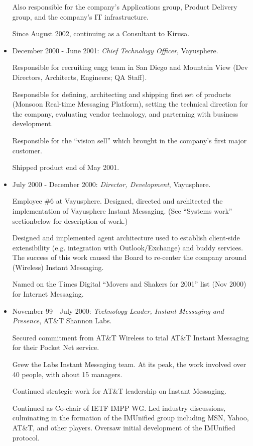 \documentclass{article}
\begin{document}
\begin{itemize}
  Also responsible for the company's Applications group, Product
  Delivery group, and the company's IT infrastructure. 

  Since August 2002, continuing as a Consultant to Kirusa.

\item December 2000 - June 2001: \textit{Chief Technology Officer}, Vayusphere.

  Responsible for recruiting engg team in San Diego and Mountain View
  (Dev Directors, Architects, Engineers; QA Staff).

  Responsible for defining, architecting and shipping first set of
  products (Monsoon Real-time Messaging Platform), setting the
  technical direction for the company, evaluating vendor technology,
  and parterning with business development.

  Responsible for the ``vision sell'' which brought in the company's
  first major customer.

  Shipped product end of May 2001.
  
\item July 2000 - December 2000:  \textit{Director, Development}, Vayusphere.

  Employee \#6 at Vayusphere. Designed, directed and architected the
  implementation of Vayusphere Instant Messaging. (See ``Systems
  work'' sectionbelow for description of work.)

  Designed and implemented agent architecture used to establish
  client-side extensibility (e.g. integration with Outlook/Exchange)
  and buddy services. The success of this work caused the Board to
  re-center the company around (Wireless) Instant Messaging.
  
  Named on the Times Digital ``Movers and Shakers for 2001'' list (Nov
  2000) for Internet Messaging.
  
\item November 99 - July 2000: 
  \textit{Technology Leader, Instant Messaging and Presence}, AT\&T Shannon
  Labs.

  Secured commitment from AT\&T Wireless to trial AT\&T Instant
  Messaging for their Pocket Net service. 

  Grew the Labs Instant Messaging team. At its peak, the work
  involved over 40 people, with about 15 managers.

  Continued strategic work for AT\&T leadership on Instant
  Messaging. 

  Continued as Co-chair of IETF IMPP WG. Led industry discussions,
  culminating in the formation of the IMUnified group including MSN,
  Yahoo, AT\&T, and other players. Oversaw initial development of the
  IMUnified protocol.


\end{itemize}
\end{document}
